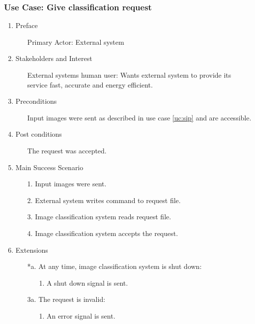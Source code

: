 \documentclass[parskip=full]{scrartcl}
\begin{document}
\subsubsection {Use Case: Give classification request}

\begin{enumerate}
	\item Preface
	\begin{itemize} [nosep]
		\item[] Primary Actor: External system
	\end{itemize}
	\item Stakeholders and Interest
	\begin{itemize} [nosep]
		\item[] External systems human user: Wants external system to provide its service fast, accurate and energy efficient.
	\end{itemize}
	\item Preconditions
	\begin{itemize} [nosep]
		\item[] Input images were sent as described in use case \ref {uc:sip} and are accessible.
	\end{itemize}
	\item Post conditions
	\begin{itemize} [nosep]
		\item[] The request was accepted.
	\end{itemize}
	\item Main Success Scenario
	\begin{itemize} [nosep]
		\item[1.] Input images were sent.
		\item[2.] External system writes command to request file.
		\item[3.] Image classification system reads request file.
		\item[4.] Image classification system accepts the request.
	\end{itemize}
	\item Extensions
	\begin{itemize} [nosep]
		\item[*a.] At any time, image classification system is shut down:
		\begin{itemize} [nosep]
			\item[1.] A shut down signal is sent.
		\end{itemize}
		\item[3a.] The request is invalid:
		\begin{itemize} [nosep]
			\item[1.] An error signal is sent.
		\end{itemize}
	\end{itemize}
\end{enumerate}
\end{document}

